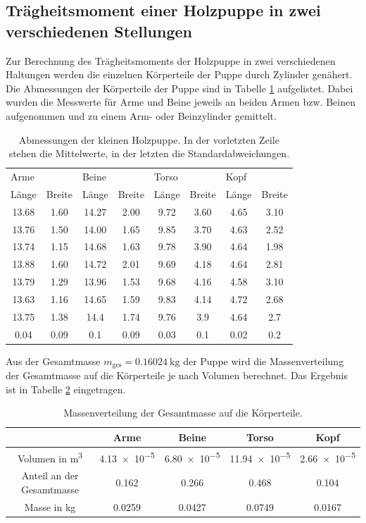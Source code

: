 \subsection{Trägheitsmoment einer Holzpuppe in zwei verschiedenen Stellungen}
Zur Berechnung des Trägheitsmoments der Holzpuppe in zwei verschiedenen Haltungen
werden die einzelnen Körperteile der Puppe durch Zylinder genähert. Die Abmessungen
der Körperteile der Puppe sind in Tabelle \ref{tab:abmessungen_puppe} aufgelistet.
Dabei wurden die Messwerte für Arme und Beine jeweils an beiden Armen bzw. Beinen
aufgenommen und zu einem Arm- oder Beinzylinder gemittelt.
\begin{table}
  \centering
  \begin{tabular}{c c c c c c c c}
    \toprule
    \multicolumn{2}{l}{Arme} & \multicolumn{2}{l}{Beine} & \multicolumn{2}{l}{Torso}
    & \multicolumn{2}{l}{Kopf} \\
    Länge & Breite & Länge & Breite & Länge & Breite & Länge & Breite \\
    \midrule
    13.68 & 1.60 & 14.27 & 2.00 & 9.72 & 3.60 & 4.65 & 3.10 \\
    13.76 & 1.50 & 14.00 & 1.65 & 9.85 & 3.70 & 4.63 & 2.52 \\
    13.74 & 1.15 & 14.68 & 1.63 & 9.78 & 3.90 & 4.64 & 1.98 \\
    13.88 & 1.60 & 14.72 & 2.01 & 9.69 & 4.18 & 4.64 & 2.81 \\
    13.79 & 1.29 & 13.96 & 1.53 & 9.68 & 4.16 & 4.58 & 3.10 \\
    13.63 & 1.16 & 14.65 & 1.59 & 9.83 & 4.14 & 4.72 & 2.68 \\
    \midrule
    13.75 & 1.38 & 14.4 & 1.74 & 9.76 & 3.9 & 4.64 & 2.7 \\
    0.04  & 0.09 & 0.1  & 0.09 & 0.03 & 0.1 & 0.02 & 0.2 \\
    \bottomrule
  \end{tabular}
  \caption{Abmessungen der kleinen Holzpuppe. In der vorletzten Zeile stehen die
  Mittelwerte, in der letzten die Standardabweichungen.}
  \label{tab:abmessungen_puppe}
\end{table}

Aus der Gesamtmasse $m_\text{ges} = \SI{0.16024}{\kilo\gram}$ der Puppe wird
die Massenverteilung der Gesamtmasse auf die Körperteile je nach Volumen berechnet.
Das Ergebnis ist in Tabelle \ref{tab:massenverteilung} eingetragen.
\begin{table}
  \centering
  \begin{tabular}{c| c c c c}
    \toprule
     & Arme & Beine & Torso & Kopf \\
    \midrule
    Volumen in \si{\cubic\meter} & \num{4.13e-5} & \num{6.80e-5} & \num{11.94e-5}
    & \num{2.66e-5} \\
    Anteil an der Gesamtmasse & 0.162 & 0.266 & 0.468 & 0.104 \\
    Masse in \si{\kilo\gram} & 0.0259 & 0.0427 & 0.0749 & 0.0167 \\
    \bottomrule
  \end{tabular}
  \caption{Massenverteilung der Gesamtmasse auf die Körperteile.}
  \label{tab:massenverteilung}
\end{table}

